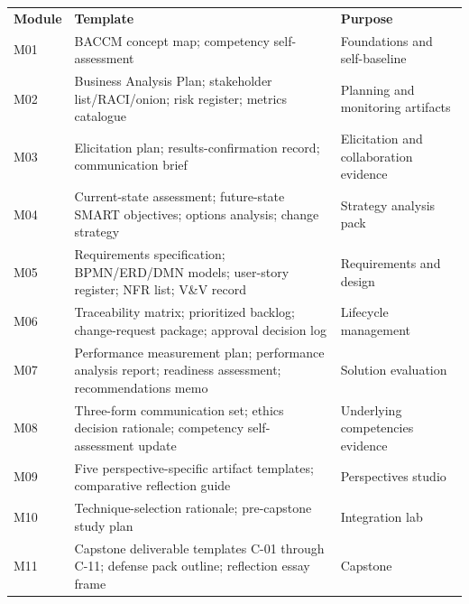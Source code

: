 \documentclass[11pt,letterpaper,oneside]{report}
\begin{document}
\renewcommand{\arraystretch}{1.18}
\begin{tabularx}{\linewidth}{@{}R{2.0cm} R{4.6cm} >{\RaggedRight\arraybackslash}X@{}}
\\
\toprule
\sffamily\bfseries Module & \sffamily\bfseries Template & \sffamily\bfseries Purpose \\
\midrule
M01 & BACCM concept map; competency self-assessment & Foundations and self-baseline \\
M02 & Business Analysis Plan; stakeholder list/RACI/onion; risk register; metrics catalogue & Planning and monitoring artifacts \\
M03 & Elicitation plan; results-confirmation record; communication brief & Elicitation and collaboration evidence \\
M04 & Current-state assessment; future-state SMART objectives; options analysis; change strategy & Strategy analysis pack \\
M05 & Requirements specification; BPMN/ERD/DMN models; user-story register; NFR list; V\&V record & Requirements and design \\
M06 & Traceability matrix; prioritized backlog; change-request package; approval decision log & Lifecycle management \\
M07 & Performance measurement plan; performance analysis report; readiness assessment; recommendations memo & Solution evaluation \\
M08 & Three-form communication set; ethics decision rationale; competency self-assessment update & Underlying competencies evidence \\
M09 & Five perspective-specific artifact templates; comparative reflection guide & Perspectives studio \\
M10 & Technique-selection rationale; pre-capstone study plan & Integration lab \\
M11 & Capstone deliverable templates C-01 through C-11; defense pack outline; reflection essay frame & Capstone \\
\bottomrule
\end{tabularx}

\end{document}
